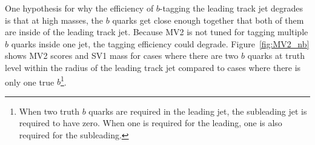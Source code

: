 One hypothesis for why the efficiency of $b$-tagging the leading track jet degrades is that at high masses, the $b$ quarks get close enough together that both of them are inside of the leading track jet. Because MV2 is not tuned for tagging multiple $b$ quarks inside one jet, the tagging efficiency could degrade. Figure~\ref{fig:MV2_nb} shows MV2 scores and SV1 mass for cases where there are two $b$ quarks at truth level within the radius of the leading track jet compared to cases where there is only one true $b$\footnote{When two truth $b$ quarks are required in the leading jet, the subleading jet is required to have zero. When one is required for the leading, one is also required for the subleading.}. 
%
\begin{figure}[h!]
  \centering
  \captionsetup{justification=centering}


\end{figure}
